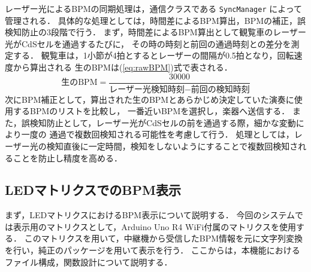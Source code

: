 \documentclass[lualatex,book,paper=a4paper,jafontsize=11.5pt,jafontscale=1.05]{jlreq}
\begin{document}
レーザー光によるBPMの同期処理は，通信クラスである \texttt{SyncManager} によって管理される．
具体的な処理としては，時間差によるBPM算出，BPMの補正，誤検知防止の3段階で行う．
まず，時間差によるBPM算出として観覧車のレーザー光がCdSセルを通過するたびに，
その時の時刻と前回の通過時刻との差分を測定する．
観覧車は，1小節が4拍とするとレーザーの間隔が0.5拍となり，回転速度から算出される
生のBPMは(\ref{eq:rawBPM})式で表される．
\begin{equation}
	\text{生のBPM} = \frac{30000}{\text{レーザー光検知時刻} - \text{前回の検知時刻}} \label{eq:rawBPM}
\end{equation}
次にBPM補正として，算出された生のBPMとあらかじめ決定していた演奏に使用するBPMのリストを比較し，
一番近いBPMを選択し，楽器へ送信する．
また，誤検知防止として，レーザー光がCdSセルの前を通過する際，細かな変動により一度の
通過で複数回検知される可能性を考慮して行う．
処理としては，レーザー光の検知直後に一定時間，検知をしないようにすることで複数回検知されることを防止し精度を高める．




\subsection{LEDマトリクスでのBPM表示}
まず，LEDマトリクスにおけるBPM表示について説明する．
今回のシステムでは表示用のマトリクスとして，Arduino Uno R4 WiFi付属のマトリクスを使用する．
このマトリクスを用いて，中継機から受信したBPM情報を元に文字列変換を行い，純正のパッケージを用いて表示を行う．
ここからは，本機能におけるファイル構成，関数設計について説明する．
\end{document}
